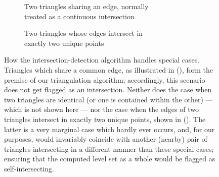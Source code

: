 \begin{figure}[htpb]
    \centering
    \begin{subfigure}[b]{0.45\textwidth}
        \centering
        \resizebox{0.9\textwidth}{!%
        }{}
        \caption[]{Two triangles sharing an edge, normally\\\phantom{(a) }
        treated as a continuous intersection}
        \label{fig:mollertrumbore_vertexshared}
    \end{subfigure}
    \begin{subfigure}[b]{0.45\textwidth}
        \centering
        \resizebox{0.9\textwidth}{!}%
        {}
        \caption[]{Two triangles whose edges intersect in\\\phantom{(b) }
            exactly two unique points
        }
        \label{fig:mollertrumbore_dualisect}
    \end{subfigure}
    \caption[How the intersection-detection algorithm handles special cases]
    {How the intersection-detection algorithm handles special cases.
        Triangles which share a common edge, as illustrated in
        (), form the premise of our
        triangulation algorithm; accordingly, this scenario does not get
        flagged as an intersection. Neither does the case when two triangles
        are identical (or one is contained within the other) --- which is not
        shown here --- nor the case when the edges of two triangles intersect
        in exactly two unique points, shown in
        (). The latter is a very marginal
        case which hardly ever occurs, and, for our purposes, would invariably
        coincide with another (nearby) pair of triangles intersecting in a
        different manner than these special cases; ensuring that the computed
        level set as a whole would be flagged as self-intersecting.
    }
    \label{fig:mollertrumbore_specialcases}
\end{figure}

